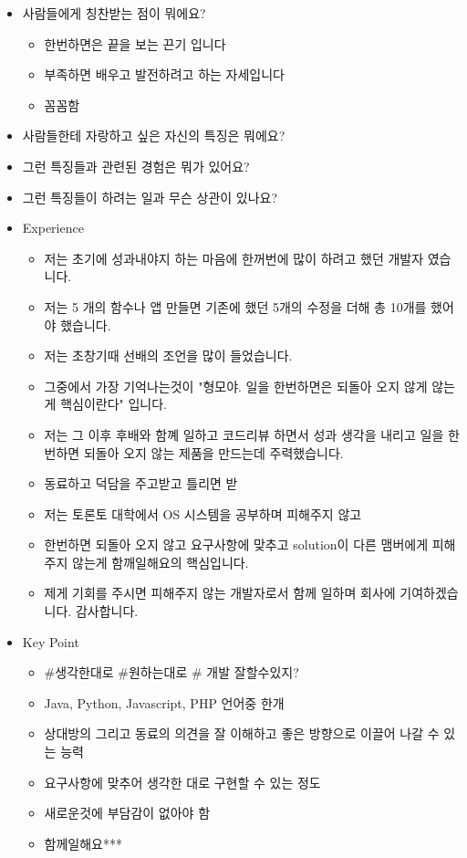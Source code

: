 \documentclass[12pt]{article}
\begin{document}
\begin{itemize}
    \item 사람들에게 칭찬받는 점이 뭐에요?
    \begin{itemize}
        \item 한번하면은 끝을 보는 끈기 입니다
        \item 부족하면 배우고 발전하려고 하는 자세입니다
        \item 꼼꼼함
    \end{itemize}
    \item 사람들한테 자랑하고 싶은 자신의 특징은 뭐에요?
    \item 그런 특징들과 관련된 경험은 뭐가 있어요?
    \item 그런 특징들이 하려는 일과 무슨 상관이 있나요?
    \item Experience
    \begin{itemize}
        \item 저는 초기에 성과내야지 하는 마음에 한꺼번에 많이 하려고 했던 개발자 였습니다.
        \item 저는 5 개의 함수나 앱 만들면 기존에 했던 5개의 수정을 더해 총 10개를 했어야 했습니다.
        \item 저는 초창기때 선배의 조언을 많이 들었습니다.
        \item 그중에서 가장 기억나는것이 "형모야. 일을 한번하면은 되돌아 오지 않게 않는게 핵심이란다" 입니다.
        \item 저는 그 이후 후배와 함꼐 일하고 코드리뷰 하면서 성과 생각을 내리고 일을 한번하면 되돌아 오지 않는 제품을 만드는데 주력했습니다.
        \item 동료하고 덕담을 주고받고 틀리면 받
        \item 저는 토론토 대학에서 OS 시스템을 공부하며 피해주지 않고
        \item 한번하면 되돌아 오지 않고 요구사항에 맞추고 solution이 다른 맴버에게 피해 주지 않는게 함깨일해요의 핵심입니다.
        \item 제게 기회를 주시면 피해주지 않는 개발자로서 함께 일하며 회사에 기여하겠습니다. 감사합니다.
    \end{itemize}
    \item Key Point
    \begin{itemize}
        \item \#생각한대로 \#원하는대로 \# 개발 잘할수있지?
        \item Java, Python, Javascript, PHP 언어중 한개
        \item 상대방의 그리고 동료의 의견을 잘 이해하고 좋은 방향으로 이끌어 나갈 수 있는 능력
        \item 요구사항에 맞추어 생각한 대로 구현할 수 있는 정도
        \item 새로운것에 부담감이 없아야 함
        \item 함께일해요***


\end{itemize}
\end{itemize}
\end{document}
